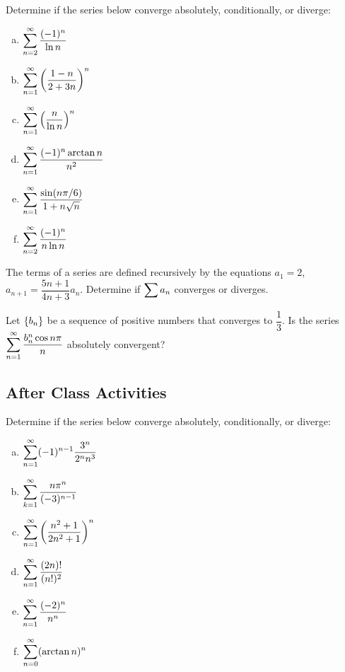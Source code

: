 \documentclass[notes]{subfiles}
\begin{document}
		\begin{ex}
			Determine if the series below converge absolutely, conditionally, or diverge:
			\begin{enumerate}[(a)]
				\item $\displaystyle \sum_{n=2}^\infty \dfrac{(-1)^n}{\ln n}$
					
				\item $\displaystyle \sum_{n=1}^\infty \left( \dfrac{1-n}{2+3n}\right)^n$
					
				\item $\displaystyle \sum_{n=1}^\infty \left( \dfrac{n}{\ln n}\right)^n$
					\newpage
					
				\item $\displaystyle \sum_{n=1}^\infty \dfrac{(-1)^n\arctan n}{n^2}$
					
				\item $\displaystyle \sum_{n=1}^\infty \dfrac{\sin(n\pi/6)}{1 + n\sqrt{n}}$
					
				\item $\displaystyle \sum_{n=2}^\infty \dfrac{(-1)^n}{n\ln n}$
			\end{enumerate}
		\end{ex}
			\newpage
			
		\begin{ex}
			The terms of a series are defined recursively by the equations $a_1 = 2$, $a_{n+1} = \dfrac{5n+1}{4n+3}a_n$.  Determine if $\displaystyle \sum a_n$ converges or diverges.
		\end{ex}
			\vs{1}
			
		\begin{ex}
			Let $\left\lbrace b_n \right\rbrace$ be a sequence of positive numbers that converges to $\dfrac{1}{3}$.  Is the series $\displaystyle \sum_{n=1}^\infty \dfrac{b_n^n\cos n\pi}{n}$ absolutely convergent?
		\end{ex}
			\vs{1}
			
			\newpage
	\subsection*{After Class Activities}
		\begin{ex}
			Determine if the series below converge absolutely, conditionally, or diverge:
			\begin{enumerate}[(a)]
				\item $\displaystyle \sum_{n=1}^\infty (-1)^{n-1} \dfrac{3^n}{2^nn^3}$
					\vs{1}
					
				\item $\displaystyle \sum_{k=1}^\infty \dfrac{n\pi^n}{(-3)^{n-1}}$
					\vs{1}
					
				\item $\displaystyle \sum_{n=1}^\infty \left( \dfrac{n^2+1}{2n^2+1}\right)^n$
					\vs{1}
					\newpage
					
				\item $\displaystyle \sum_{n=1}^\infty \dfrac{(2n)!}{(n!)^2}$
					\vs{1}
					
				\item $\displaystyle \sum_{n=1}^\infty \dfrac{(-2)^n}{n^n}$
					\vs{1}
					
				\item $\displaystyle \sum_{n=0}^\infty (\arctan n)^n$
					\vs{1}
			\end{enumerate}
		\end{ex}
\clearpage
\end{document}
